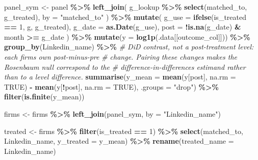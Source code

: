 \documentclass[
]{article}
\newenvironment{Shaded}{\begin{snugshade}}{\end{snugshade}}
\newcommand{\AttributeTok}[1]{\textcolor[rgb]{0.13,0.29,0.53}{#1}}
\newcommand{\CommentTok}[1]{\textcolor[rgb]{0.56,0.35,0.01}{\textit{#1}}}
\newcommand{\ConstantTok}[1]{\textcolor[rgb]{0.56,0.35,0.01}{#1}}
\newcommand{\DecValTok}[1]{\textcolor[rgb]{0.00,0.00,0.81}{#1}}
\newcommand{\FunctionTok}[1]{\textcolor[rgb]{0.13,0.29,0.53}{\textbf{#1}}}
\newcommand{\NormalTok}[1]{#1}
\newcommand{\OtherTok}[1]{\textcolor[rgb]{0.56,0.35,0.01}{#1}}
\newcommand{\SpecialCharTok}[1]{\textcolor[rgb]{0.81,0.36,0.00}{\textbf{#1}}}
\newcommand{\StringTok}[1]{\textcolor[rgb]{0.31,0.60,0.02}{#1}}
\begin{document}
\begin{Shaded}
\begin{Highlighting}[]
\NormalTok{  panel\_sym }\OtherTok{\textless{}{-}}\NormalTok{ panel }\SpecialCharTok{\%\textgreater{}\%}
    \FunctionTok{left\_join}\NormalTok{(}
\NormalTok{      g\_lookup }\SpecialCharTok{\%\textgreater{}\%} \FunctionTok{select}\NormalTok{(matched\_to, g\_treated),}
      \AttributeTok{by =} \StringTok{"matched\_to"}
\NormalTok{    ) }\SpecialCharTok{\%\textgreater{}\%}
    \FunctionTok{mutate}\NormalTok{(}
      \AttributeTok{g\_use  =} \FunctionTok{ifelse}\NormalTok{(is\_treated }\SpecialCharTok{==} \DecValTok{1}\NormalTok{, g, g\_treated),}
      \AttributeTok{g\_date =} \FunctionTok{as.Date}\NormalTok{(g\_use),}
      \AttributeTok{post   =} \SpecialCharTok{!}\FunctionTok{is.na}\NormalTok{(g\_date) }\SpecialCharTok{\&}\NormalTok{ month }\SpecialCharTok{\textgreater{}=}\NormalTok{ g\_date}
\NormalTok{    ) }\SpecialCharTok{\%\textgreater{}\%}
    \FunctionTok{mutate}\NormalTok{(}\AttributeTok{y =} \FunctionTok{log1p}\NormalTok{(.data[[outcome\_col]])) }\SpecialCharTok{\%\textgreater{}\%}
    \FunctionTok{group\_by}\NormalTok{(Linkedin\_name) }\SpecialCharTok{\%\textgreater{}\%}
    \CommentTok{\# DiD contrast, not a post{-}treatment level: each firm\textquotesingle{}s own post{-}minus{-}pre}
    \CommentTok{\# change. Pairing these changes makes the Rosenbaum null correspond to the}
    \CommentTok{\# difference{-}in{-}differences estimand rather than to a level difference.}
    \FunctionTok{summarise}\NormalTok{(}\AttributeTok{y\_mean =} \FunctionTok{mean}\NormalTok{(y[post], }\AttributeTok{na.rm =} \ConstantTok{TRUE}\NormalTok{) }\SpecialCharTok{{-}} \FunctionTok{mean}\NormalTok{(y[}\SpecialCharTok{!}\NormalTok{post], }\AttributeTok{na.rm =} \ConstantTok{TRUE}\NormalTok{),}
              \AttributeTok{.groups =} \StringTok{"drop"}\NormalTok{) }\SpecialCharTok{\%\textgreater{}\%}
    \FunctionTok{filter}\NormalTok{(}\FunctionTok{is.finite}\NormalTok{(y\_mean))}

\NormalTok{  firms }\OtherTok{\textless{}{-}}\NormalTok{ firms }\SpecialCharTok{\%\textgreater{}\%}
    \FunctionTok{left\_join}\NormalTok{(panel\_sym, }\AttributeTok{by =} \StringTok{"Linkedin\_name"}\NormalTok{)}

\NormalTok{  treated }\OtherTok{\textless{}{-}}\NormalTok{ firms }\SpecialCharTok{\%\textgreater{}\%}
    \FunctionTok{filter}\NormalTok{(is\_treated }\SpecialCharTok{==} \DecValTok{1}\NormalTok{) }\SpecialCharTok{\%\textgreater{}\%}
    \FunctionTok{select}\NormalTok{(matched\_to, Linkedin\_name, }\AttributeTok{y\_treated =}\NormalTok{ y\_mean) }\SpecialCharTok{\%\textgreater{}\%}
    \FunctionTok{rename}\NormalTok{(}\AttributeTok{treated\_name =}\NormalTok{ Linkedin\_name)}


\end{Highlighting}
\end{Shaded}
\end{document}
